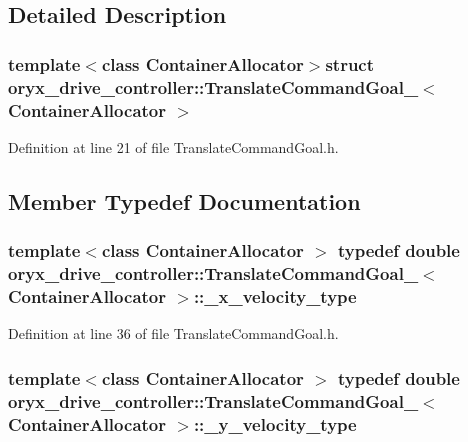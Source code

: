 \subsection{\-Detailed \-Description}
\subsubsection*{template$<$class Container\-Allocator$>$struct oryx\-\_\-drive\-\_\-controller\-::\-Translate\-Command\-Goal\-\_\-$<$ Container\-Allocator $>$}



\-Definition at line 21 of file \-Translate\-Command\-Goal.\-h.



\subsection{\-Member \-Typedef \-Documentation}
\subsubsection[{\-\_\-x\-\_\-velocity\-\_\-type}]{\setlength{\rightskip}{0pt plus 5cm}template$<$class Container\-Allocator $>$ typedef double {\bf oryx\-\_\-drive\-\_\-controller\-::\-Translate\-Command\-Goal\-\_\-}$<$ \-Container\-Allocator $>$\-::{\bf \-\_\-x\-\_\-velocity\-\_\-type}}\label{structoryx__drive__controller_1_1TranslateCommandGoal___a06bd6bf730bbf00ee933d73114c023c6}


\-Definition at line 36 of file \-Translate\-Command\-Goal.\-h.

\subsubsection[{\-\_\-y\-\_\-velocity\-\_\-type}]{\setlength{\rightskip}{0pt plus 5cm}template$<$class Container\-Allocator $>$ typedef double {\bf oryx\-\_\-drive\-\_\-controller\-::\-Translate\-Command\-Goal\-\_\-}$<$ \-Container\-Allocator $>$\-::{\bf \-\_\-y\-\_\-velocity\-\_\-type}}\label{structoryx__drive__controller_1_1TranslateCommandGoal___acaa35d2e87c3fab86f7d609180042b46}



